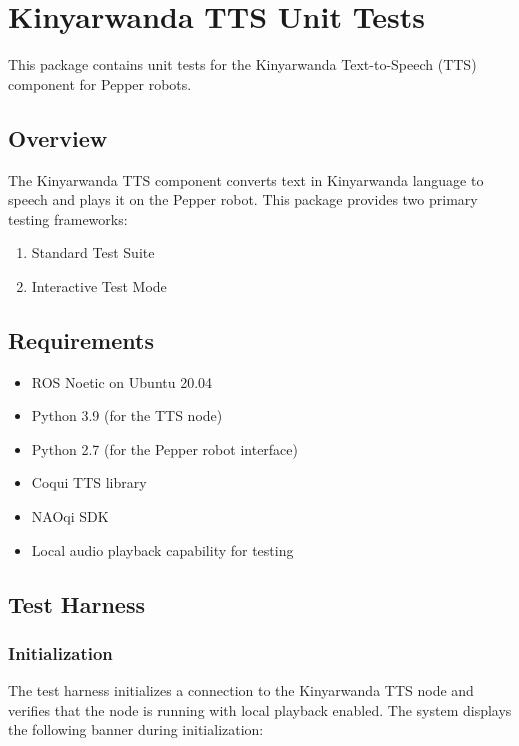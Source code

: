 \documentclass{CSSRforAfrica}
\begin{document}
\newpage

\section{Kinyarwanda TTS Unit Tests}
This package contains unit tests for the Kinyarwanda Text-to-Speech (TTS) component for Pepper robots.

\subsection{Overview}
The Kinyarwanda TTS component converts text in Kinyarwanda language to speech and plays it on the Pepper robot. This package provides two primary testing frameworks:
\begin{enumerate}
    \item Standard Test Suite
    \item Interactive Test Mode
\end{enumerate}

\subsection{Requirements}
\begin{itemize}
    \item ROS Noetic on Ubuntu 20.04
    \item Python 3.9 (for the TTS node)
    \item Python 2.7 (for the Pepper robot interface)
    \item Coqui TTS library
    \item NAOqi SDK
    \item Local audio playback capability for testing
\end{itemize}

\subsection{Test Harness}
\subsubsection{Initialization}
The test harness initializes a connection to the Kinyarwanda TTS node and verifies that the node is running with local playback enabled. The system displays the following banner during initialization:
\end{document}
